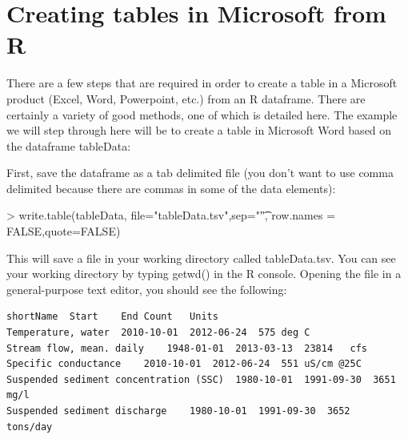 \documentclass[a4paper,11pt]{article}
\begin{document}
\section{Creating tables in Microsoft from R}
\label{app:createWordTable}
There are a few steps that are required in order to create a table in a Microsoft product (Excel, Word, Powerpoint, etc.) from an R dataframe. There are certainly a variety of good methods, one of which is detailed here. The example we will step through here will be to create a table in Microsoft Word based on the dataframe tableData:

\begin{Schunk}
\end{Schunk}

First, save the dataframe as a tab delimited file (you don't want to use comma delimited because there are commas in some of the data elements):


\begin{Schunk}
\begin{Sinput}
> write.table(tableData, file="tableData.tsv",sep="\t",
             row.names = FALSE,quote=FALSE)
\end{Sinput}
\end{Schunk}

This will save a file in your working directory called tableData.tsv.  You can see your working directory by typing getwd() in the R console. Opening the file in a general-purpose text editor, you should see the following:

\begin{verbatim}
shortName  Start	End	Count	Units
Temperature, water	2010-10-01	2012-06-24	575	deg C
Stream flow, mean. daily	1948-01-01	2013-03-13	23814	cfs
Specific conductance	2010-10-01	2012-06-24	551	uS/cm @25C
Suspended sediment concentration (SSC)	1980-10-01	1991-09-30	3651	mg/l
Suspended sediment discharge	1980-10-01	1991-09-30	3652	tons/day
\end{verbatim}
\end{document}
